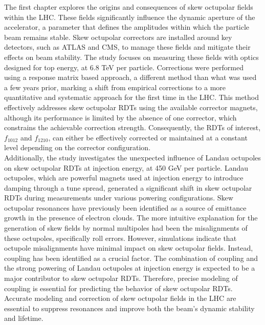{%
The first chapter explores the origins and consequences of skew octupolar fields within the LHC.
These fields significantly influence the dynamic aperture of the accelerator, a parameter
that defines the amplitudes within which the particle beam remains stable. Skew octupolar correctors
are installed around key detectors, such as ATLAS and CMS, to manage these fields and mitigate their
effects on beam stability. The study focuses on measuring these fields with optics designed for top
energy, at 6.8 TeV per particle. Corrections were performed using a response matrix based approach,
a different method than what was used a few years prior, marking a shift from empirical corrections
to a more quantitative and systematic approach for the first time in the LHC. 
This method effectively addresses skew octupolar RDTs using the available corrector magnets,
although its performance is limited by the absence of one corrector, which constrains the achievable
correction strength. Consequently, the RDTs of interest, $f_{1012}$ and $f_{1210}$, can either be
effectively corrected or maintained at a constant level depending on the corrector configuration.
\\
\indent
Additionally, the study investigates the unexpected influence of Landau octupoles on skew octupolar
RDTs at injection energy, at 450 GeV per particle. Landau octupoles, which are powerful magnets used
at injection energy to introduce damping through a tune spread, generated a significant shift in
skew octupolar RDTs during measurements under various powering configurations. Skew octupolar
resonances have previously been identified as a source of emittance growth in the presence of
electron clouds. The more intuitive explanation for the generation of skew fields by normal
multipoles had been the misalignments of these octupoles, specifically roll errors. However,
simulations indicate that octupole misalignments have minimal impact on skew octupolar fields.
Instead, coupling has been identified as a crucial factor. The combination of coupling and the
strong powering of Landau octupoles at injection energy is expected to be a major contributor to
skew octupolar RDTs. Therefore, precise modeling of coupling is essential for predicting the
behavior of skew octupolar RDTs. Accurate modeling and correction of skew octupolar fields in the
LHC are essential to suppress resonances and improve both the beam's dynamic stability and lifetime.


}
